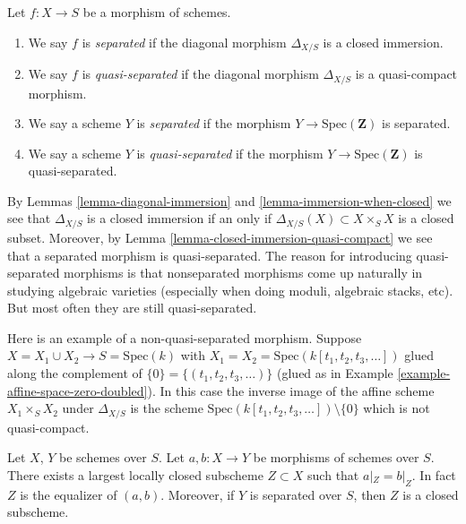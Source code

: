 \begin{definition}
\label{definition-separated}
Let $f : X \to S$ be a morphism of schemes.
\begin{enumerate}
\item We say $f$ is {\it separated} if the diagonal morphism $\Delta_{X/S}$
is a closed immersion.
\item We say $f$ is {\it quasi-separated} if the diagonal morphism
$\Delta_{X/S}$ is a quasi-compact morphism.
\item We say a scheme $Y$ is {\it separated} if the morphism
$Y \to \text{Spec}(\mathbf{Z})$ is separated.
\item We say a scheme $Y$ is {\it quasi-separated} if the morphism
$Y \to \text{Spec}(\mathbf{Z})$ is quasi-separated.
\end{enumerate}
\end{definition}

\noindent
By Lemmas \ref{lemma-diagonal-immersion} and \ref{lemma-immersion-when-closed}
we see that $\Delta_{X/S}$ is a closed immersion if an only if
$\Delta_{X/S}(X) \subset X\times_S X$ is a closed subset. Moreover,
by Lemma \ref{lemma-closed-immersion-quasi-compact} we see that a
separated morphism is quasi-separated. The reason for introducing
quasi-separated morphisms is that nonseparated morphisms come up naturally
in studying algebraic varieties (especially when doing moduli,
algebraic stacks, etc). But most often they are still quasi-separated.

\begin{example}
\label{example-not-quasi-separated}
Here is an example of a non-quasi-separated morphism.
Suppose $X = X_1 \cup X_2 \to S = \text{Spec}(k)$ with
$X_1 = X_2 = \text{Spec}(k[t_1, t_2, t_3, \ldots])$
glued along the complement of $\{0\} = \{(t_1, t_2, t_3, \ldots)\}$
(glued as in Example \ref{example-affine-space-zero-doubled}).
In this case the inverse image of the affine scheme
$X_1 \times_S X_2$ under $\Delta_{X/S}$ is the scheme
$\text{Spec}(k[t_1, t_2, t_3, \ldots]) \setminus \{0\}$
which is not quasi-compact.
\end{example}

\begin{lemma}
\label{lemma-where-are-they-equal}
Let $X$, $Y$ be schemes over $S$.
Let $a, b : X \to Y$ be morphisms of schemes over $S$.
There exists a largest locally closed subscheme
$Z \subset X$ such that $a|_Z = b|_Z$. In fact $Z$ is
the equalizer of $(a, b)$. Moreover, if $Y$ is separated
over $S$, then $Z$ is a closed subscheme.
\end{lemma}

